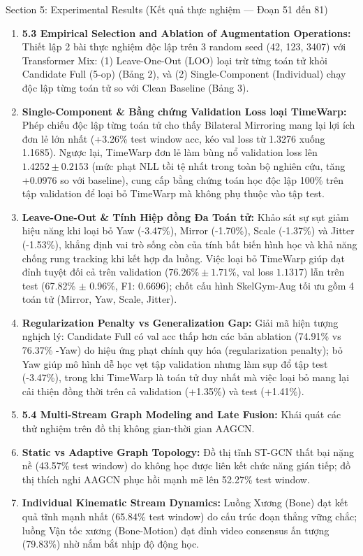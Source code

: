 \documentclass[10pt,a4paper]{article}
\begin{document}
\begin{secbox}{Section 5: Experimental Results (Kết quả thực nghiệm — Đoạn 51 đến 81)}
\begin{enumerate}[leftmargin=*, itemsep=2pt, topsep=1pt, start=51]
    \item \textbf{5.3 Empirical Selection and Ablation of Augmentation Operations:} Thiết lập 2 bài thực nghiệm độc lập trên 3 random seed (42, 123, 3407) với Transformer Mix: (1) Leave-One-Out (LOO) loại trừ từng toán tử khỏi Candidate Full (5-op) (Bảng 2), và (2) Single-Component (Individual) chạy độc lập từng toán tử so với Clean Baseline (Bảng 3).
    \item \textbf{Single-Component \& Bằng chứng Validation Loss loại TimeWarp:} Phép chiếu độc lập từng toán tử cho thấy Bilateral Mirroring mang lại lợi ích đơn lẻ lớn nhất (+3.26\% test window acc, kéo val loss từ 1.3276 xuống 1.1685). Ngược lại, TimeWarp đơn lẻ làm bùng nổ validation loss lên $1.4252 \pm 0.2153$ (mức phạt NLL tồi tệ nhất trong toàn bộ nghiên cứu, tăng +0.0976 so với baseline), cung cấp bằng chứng toán học độc lập 100\% trên tập validation để loại bỏ TimeWarp mà không phụ thuộc vào tập test.
    \item \textbf{Leave-One-Out \& Tính Hiệp đồng Đa Toán tử:} Khảo sát sự sụt giảm hiệu năng khi loại bỏ Yaw (-3.47\%), Mirror (-1.70\%), Scale (-1.37\%) và Jitter (-1.53\%), khẳng định vai trò sống còn của tính bất biến hình học và khả năng chống rung tracking khi kết hợp đa luồng. Việc loại bỏ TimeWarp giúp đạt đỉnh tuyệt đối cả trên validation ($76.26\% \pm 1.71\%$, val loss $1.1317$) lẫn trên test (67.82\% $\pm$ 0.96\%, F1: 0.6696); chốt cấu hình SkelGym-Aug tối ưu gồm 4 toán tử (Mirror, Yaw, Scale, Jitter).
    \item \textbf{Regularization Penalty vs Generalization Gap:} Giải mã hiện tượng nghịch lý: Candidate Full có val acc thấp hơn các bản ablation (74.91\% vs 76.37\% -Yaw) do hiệu ứng phạt chính quy hóa (regularization penalty); bỏ Yaw giúp mô hình dễ học vẹt tập validation nhưng làm sụp đổ tập test (-3.47\%), trong khi TimeWarp là toán tử duy nhất mà việc loại bỏ mang lại cải thiện đồng thời trên cả validation (+1.35\%) và test (+1.41\%).
    \item \textbf{5.4 Multi-Stream Graph Modeling and Late Fusion:} Khái quát các thử nghiệm trên đồ thị không gian-thời gian AAGCN.
    \item \textbf{Static vs Adaptive Graph Topology:} Đồ thị tĩnh ST-GCN thất bại nặng nề (43.57\% test window) do không học được liên kết chức năng gián tiếp; đồ thị thích nghi AAGCN phục hồi mạnh mẽ lên 52.27\% test window.
    \item \textbf{Individual Kinematic Stream Dynamics:} Luồng Xương (Bone) đạt kết quả tĩnh mạnh nhất (65.84\% test window) do cấu trúc đoạn thẳng vững chắc; luồng Vận tốc xương (Bone-Motion) đạt đỉnh video consensus ấn tượng (79.83\%) nhờ nắm bắt nhịp độ động học.

\end{enumerate}
\end{secbox}
\end{document}
